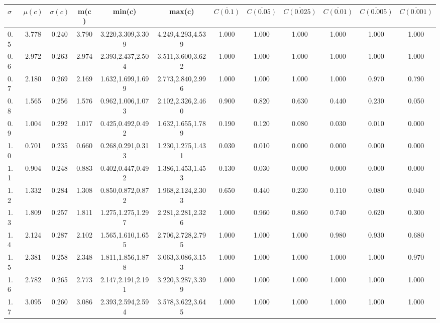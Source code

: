 \begin{table*}[h!]
\begin{center}
\begin{tabular}{| l | c | c | c | c | c | c | c | c | c | c | c |}\hline
$\sigma$ & $\mu(c)$ & $\sigma(c)$ & m(c) & min(c) & max(c) & $\overline{C(0.1)}$ & $\overline{C(0.05)}$ & $\overline{C(0.025)}$ & $\overline{C(0.01)}$ & $\overline{C(0.005)}$ & $\overline{C(0.001)}$ \\\hline
0.5 & 3.778 & 0.240 & 3.790 & 3.220,3.309,3.309 & 4.249,4.293,4.539  & 1.000  & 1.000  & 1.000  & 1.000  & 1.000  & 1.000 \\\hline
0.6 & 2.972 & 0.263 & 2.974 & 2.393,2.437,2.504 & 3.511,3.600,3.622  & 1.000  & 1.000  & 1.000  & 1.000  & 1.000  & 1.000 \\\hline
0.7 & 2.180 & 0.269 & 2.169 & 1.632,1.699,1.699 & 2.773,2.840,2.996  & 1.000  & 1.000  & 1.000  & 1.000  & 0.970  & 0.790 \\\hline
0.8 & 1.565 & 0.256 & 1.576 & 0.962,1.006,1.073 & 2.102,2.326,2.460  & 0.900  & 0.820  & 0.630  & 0.440  & 0.230  & 0.050 \\\hline
0.9 & 1.004 & 0.292 & 1.017 & 0.425,0.492,0.492 & 1.632,1.655,1.789  & 0.190  & 0.120  & 0.080  & 0.030  & 0.010  & 0.000 \\\hline
1.0 & 0.701 & 0.235 & 0.660 & 0.268,0.291,0.313 & 1.230,1.275,1.431  & 0.030  & 0.010  & 0.000  & 0.000  & 0.000  & 0.000 \\\hline
1.1 & 0.904 & 0.248 & 0.883 & 0.402,0.447,0.492 & 1.386,1.453,1.453  & 0.130  & 0.030  & 0.000  & 0.000  & 0.000  & 0.000 \\\hline
1.2 & 1.332 & 0.284 & 1.308 & 0.850,0.872,0.872 & 1.968,2.124,2.303  & 0.650  & 0.440  & 0.230  & 0.110  & 0.080  & 0.040 \\\hline
1.3 & 1.809 & 0.257 & 1.811 & 1.275,1.275,1.297 & 2.281,2.281,2.326  & 1.000  & 0.960  & 0.860  & 0.740  & 0.620  & 0.300 \\\hline
1.4 & 2.124 & 0.287 & 2.102 & 1.565,1.610,1.655 & 2.706,2.728,2.795  & 1.000  & 1.000  & 1.000  & 0.980  & 0.930  & 0.680 \\\hline
1.5 & 2.381 & 0.258 & 2.348 & 1.811,1.856,1.878 & 3.063,3.086,3.153  & 1.000  & 1.000  & 1.000  & 1.000  & 1.000  & 0.970 \\\hline
1.6 & 2.782 & 0.265 & 2.773 & 2.147,2.191,2.191 & 3.220,3.287,3.399  & 1.000  & 1.000  & 1.000  & 1.000  & 1.000  & 1.000 \\\hline
1.7 & 3.095 & 0.260 & 3.086 & 2.393,2.594,2.594 & 3.578,3.622,3.645  & 1.000  & 1.000  & 1.000  & 1.000  & 1.000  & 1.000 \\\hline

\end{tabular}
\end{center}
\end{table*}
